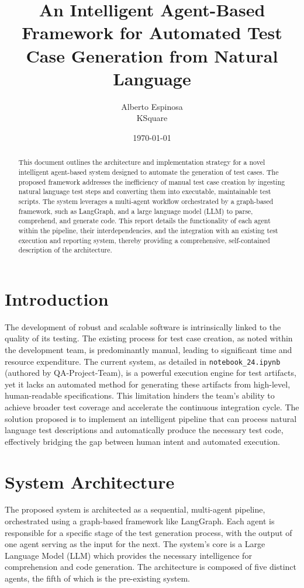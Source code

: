 \documentclass{article}
\date{\today}
\title{An Intelligent Agent-Based Framework for Automated Test Case Generation from Natural Language}
\author{Alberto Espinosa\\
KSquare}
\begin{document}
\maketitle

\begin{abstract}
\noindent
This document outlines the architecture and implementation strategy for a novel intelligent agent-based system designed to automate the generation of test cases. The proposed framework addresses the inefficiency of manual test case creation by ingesting natural language test steps and converting them into executable, maintainable test scripts. The system leverages a multi-agent workflow orchestrated by a graph-based framework, such as LangGraph, and a large language model (LLM) to parse, comprehend, and generate code. This report details the functionality of each agent within the pipeline, their interdependencies, and the integration with an existing test execution and reporting system, thereby providing a comprehensive, self-contained description of the architecture.
\end{abstract}

\section{Introduction}
The development of robust and scalable software is intrinsically linked to the quality of its testing. The existing process for test case creation, as noted within the development team, is predominantly manual, leading to significant time and resource expenditure. The current system, as detailed in \texttt{notebook\_24.ipynb} (authored by QA-Project-Team), is a powerful execution engine for test artifacts, yet it lacks an automated method for generating these artifacts from high-level, human-readable specifications. This limitation hinders the team's ability to achieve broader test coverage and accelerate the continuous integration cycle. The solution proposed is to implement an intelligent pipeline that can process natural language test descriptions and automatically produce the necessary test code, effectively bridging the gap between human intent and automated execution.

\section{System Architecture}
The proposed system is architected as a sequential, multi-agent pipeline, orchestrated using a graph-based framework like LangGraph. Each agent is responsible for a specific stage of the test generation process, with the output of one agent serving as the input for the next. The system’s core is a Large Language Model (LLM) which provides the necessary intelligence for comprehension and code generation. The architecture is composed of five distinct agents, the fifth of which is the pre-existing system.
\end{document}
